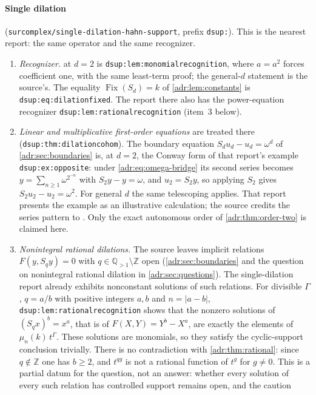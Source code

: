 \documentclass[11pt,letterpaper]{article}
\numberwithin{equation}{section}
\theoremstyle{definition}
\theoremstyle{remark}
\newcommand{\Q}{\mathbb Q}
\newcommand{\Z}{\mathbb Z}
\newcommand{\abs}[1]{\lvert#1\rvert}
\newcommand{\rpath}[1]{\nolinkurl{#1}}%
\newcommand{\lbl}[1]{\nolinkurl{#1}}%
\begin{document}
\paragraph{Single dilation} (\rpath{surcomplex/single-dilation-hahn-support},
prefix \texttt{dsup:}). This is the nearest report: the same operator and
the same recognizer.
\begin{enumerate}[leftmargin=*,itemsep=3pt]
\item \emph{Recognizer.}  at $d=2$ is
\lbl{dsup:lem:monomialrecognition}, where $a=a^2$ forces coefficient one,
with the same least-term proof; the general-$d$ statement is the source's.
The equality $\operatorname{Fix}(S_d)=k$ of \cref{adr:lem:constants} is
\lbl{dsup:eq:dilationfixed}. The report there also has the power-equation
recognizer \lbl{dsup:lem:rationalrecognition} (item~3 below).
\item \emph{Linear and multiplicative first-order equations} are treated
there (\lbl{dsup:thm:dilationcohom}). The boundary equation
$S_du_d-u_d=\omega^d$ of \cref{adr:sec:boundaries} is, at $d=2$, the Conway
form of that report's example \lbl{dsup:ex:opposite}: under
\eqref{adr:eq:omega-bridge} its second series becomes
$y=\sum_{n\ge1}\omega^{2^{-n}}$ with $S_2y-y=\omega$, and $u_2=S_2y$, so
applying $S_2$ gives $S_2u_2-u_2=\omega^2$. For general $d$ the same
telescoping applies. That report presents the example as an illustrative
calculation; the source credits the series pattern to \cite{CDDM,GG}. Only
the exact autonomous order of \cref{adr:thm:order-two} is claimed here.
\item \emph{Nonintegral rational dilations.} The source leaves implicit
relations $F(y,S_qy)=0$ with $q\in\Q_{>1}\setminus\Z$ open
(\cref{adr:sec:boundaries} and the question on nonintegral rational
dilation in \cref{adr:sec:questions}). The single-dilation report already
exhibits nonconstant solutions of such relations. For divisible $\Gamma$,
$q=a/b$ with positive integers $a,b$ and $n=\abs{a-b}$,
\lbl{dsup:lem:rationalrecognition} shows that the nonzero solutions of
$(S_qx)^b=x^a$, that is of $F(X,Y)=Y^b-X^a$, are exactly the elements of
$\mu_n(k)\,t^\Gamma$. These solutions are monomials, so they satisfy the
cyclic-support conclusion trivially. There is no contradiction with
\cref{adr:thm:rational}: since $q\notin\Z$ one has $b\ge2$, and
$t^{qg}$ is not a rational function of $t^g$ for $g\neq0$. This is a
partial datum for the question, not an answer: whether every solution of
every such relation has controlled support remains open, and the caution

\end{enumerate}
\end{document}
